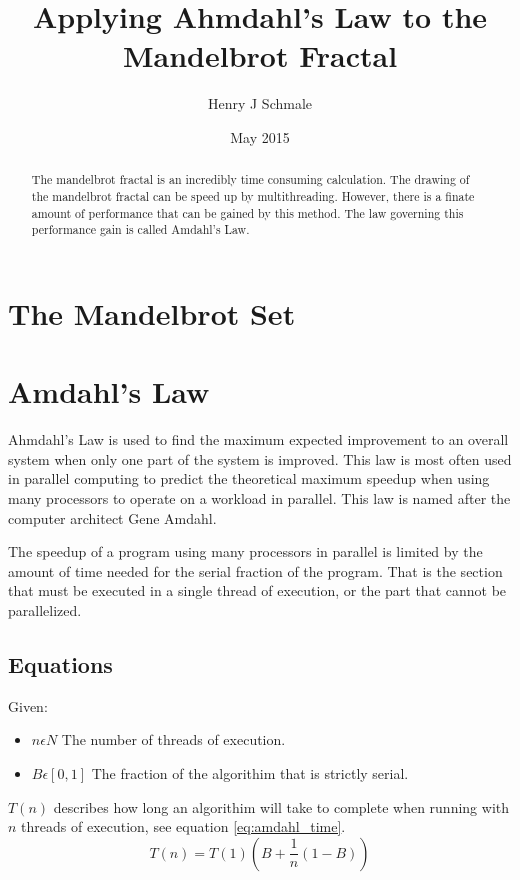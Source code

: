 \documentclass[10pt,oneside,letter]{article}
\begin{document}
\title{Applying Ahmdahl's Law to the Mandelbrot Fractal}
\author{Henry J Schmale}
\date{May 2015}
\maketitle

\begin{abstract}
The mandelbrot fractal is an incredibly time consuming calculation.
The drawing of the mandelbrot fractal can be speed up by multithreading.
However, there is a finate amount of performance that can be gained by
this method. The law governing this performance gain is called Amdahl's
Law.
\end{abstract}

\section{The Mandelbrot Set}

\section{Amdahl's Law}
Ahmdahl's Law is used to find the maximum expected improvement to an overall
system when only one part of the system is improved. This law is most often
used in parallel computing to predict the theoretical maximum speedup when
using many processors to operate on a workload in parallel. This law is named
after the computer architect Gene Amdahl.

The speedup of a program using many processors in parallel is limited by the
amount of time needed for the serial fraction of the program. That is the
section that must be executed in a single thread of execution, or the part
that cannot be parallelized.

\subsection{Equations}
Given:
\begin{itemize}
  \item $n \epsilon N$ The number of threads of execution.
  \item $B \epsilon [0,1]$ The fraction of the algorithim that is
      strictly serial.
\end{itemize}

$T(n)$ describes how long an algorithim will take to complete when running
with $n$ threads of execution, see equation \eqref{eq:amdahl_time}.
\begin{equation} \label{eq:amdahl_time}
    T(n) = T(1)(B + \frac{1}{n}(1-B))
\end{equation}
\end{document}
